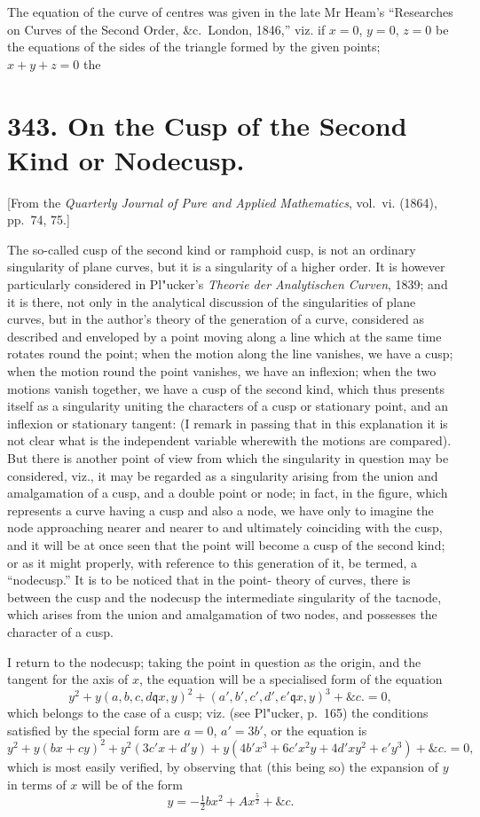 \documentclass[11pt,a4paper]{article}
\theoremstyle{definition}
\begin{document}
The equation of the curve of centres was given in the late Mr Heam's ``Researches
on Curves of the Second Order, \&c.\ London, 1846,'' viz. if $x = 0$, $y = 0$, $z = 0$ be the
equations of the sides of the triangle formed by the given points; $x + y + z = 0$ the
\newpage
\section{343. On the Cusp of the Second Kind or Nodecusp.}

[From the \textit{Quarterly Journal of Pure and Applied Mathematics}, vol.\ vi. (1864),
pp.~74, 75.]

The so-called cusp of the second kind or ramphoid cusp, is not an ordinary
singularity of plane curves, but it is a singularity of a higher order. It is however
particularly considered in Pl"ucker's \textit{Theorie der Analytischen Curven}, 1839; and it is
there, not only in the analytical discussion of the singularities of plane curves, but
in the author's theory of the generation of a curve, considered as described and
enveloped by a point moving along a line which at the same time rotates round
the point; when the motion along the line vanishes, we have a cusp; when the
motion round the point vanishes, we have an inflexion; when the two motions vanish
together, we have a cusp of the second kind, which thus presents itself as a singularity
uniting the characters of a cusp or stationary point, and an inflexion or stationary
tangent: (I remark in passing that in this explanation it is not clear what is the
independent variable wherewith the motions are compared). But there is another point
of view from which the singularity in question may be considered, viz., it may be
regarded as a singularity arising from the union and amalgamation of a cusp, and a
double point or node; in fact, in the figure, which represents a curve having a cusp
and also a node, we have only to imagine the node approaching nearer and nearer to
and ultimately coinciding with the cusp, and it will be at once seen that the point
will become a cusp of the second kind; or as it might properly, with reference to
this generation of it, be termed, a ``nodecusp.'' It is to be noticed that in the point-
theory of curves, there is between the cusp and the nodecusp the intermediate singularity
of the tacnode, which arises from the union and amalgamation of two nodes, and
possesses the character of a cusp.

I return to the nodecusp; taking the point in question as the origin, and the
tangent for the axis of $x$, the equation will be a specialised form of the equation
\[
y^2 + y(a, b, c, d \mathbin{\mathfrak{q}} x, y)^2 + (a', b', c', d', e' \mathbin{\mathfrak{q}} x, y)^3 + \&c. = 0,
\]
which belongs to the case of a cusp; viz. (see Pl"ucker, p.\ 165) the conditions satisfied
by the special form are $a = 0$, $a' = 3b'$, or the equation is
\[
y^2 + y(bx + cy)^2 + y^2(3c'x + d'y) + y(4b'x^3 + 6c'x^2y + 4d'xy^2 + e'y^3) + \&c. = 0,
\]
which is most easily verified, by observing that (this being so) the expansion of $y$ in
terms of $x$ will be of the form
\[
y = -\tfrac{1}{2}bx^2 + Ax^{\frac{5}{2}} + \&c.
\]
\end{document}
